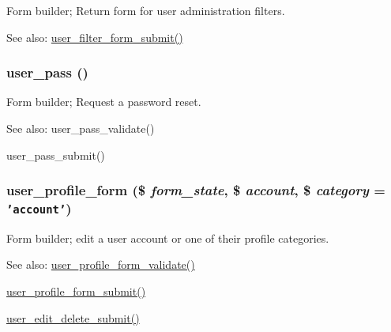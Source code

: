 Form builder; Return form for user administration filters.

\begin{Desc}
\item[See also:]\hyperlink{user_8admin_8inc_edf12621a6f405cf3032a9319771b4e1}{user\_\-filter\_\-form\_\-submit()} \end{Desc}
\hypertarget{group__forms_gd7f952e136ebcff493ca8de7209100cf}{
\subsubsection[{user\_\-pass}]{\setlength{\rightskip}{0pt plus 5cm}user\_\-pass ()}}
\label{group__forms_gd7f952e136ebcff493ca8de7209100cf}


Form builder; Request a password reset.

\begin{Desc}
\item[See also:]user\_\-pass\_\-validate() 

user\_\-pass\_\-submit() \end{Desc}
\hypertarget{group__forms_g7e8a3661add00171d560bec439570fd7}{
\subsubsection[{user\_\-profile\_\-form}]{\setlength{\rightskip}{0pt plus 5cm}user\_\-profile\_\-form (\$ {\em form\_\-state}, \/  \$ {\em account}, \/  \$ {\em category} = {\tt 'account'})}}
\label{group__forms_g7e8a3661add00171d560bec439570fd7}


Form builder; edit a user account or one of their profile categories.

\begin{Desc}
\item[See also:]\hyperlink{user_8pages_8inc_fca5f516f0fadcb918e6d13dff66db76}{user\_\-profile\_\-form\_\-validate()} 

\hyperlink{user_8pages_8inc_c10455f162f61cbf551fe7ec7b5c92cc}{user\_\-profile\_\-form\_\-submit()} 

\hyperlink{user_8pages_8inc_13c3ecd9255448bd605fcd4ee0daa294}{user\_\-edit\_\-delete\_\-submit()} \end{Desc}
